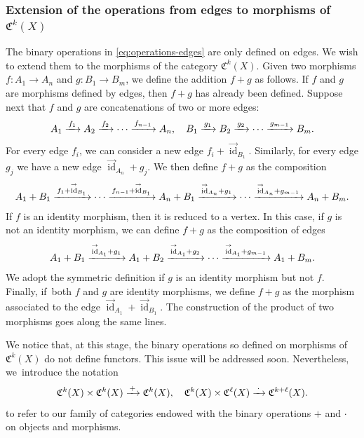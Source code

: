 \documentclass[JEP,XML,SOM,Unicode,published]{cedram}
\newcommand\To[1]{\mathchoice{\xrightarrow{\kern1pt#1\kern1pt}}{\stackrel{#1}{\longrightarrow}}{}{}}
\theoremstyle{plain}
\theoremstyle{definition}
\newcommand{\Cfrak}{\mathfrak C}
\DeclareMathOperator{\id}{id}
\begin{document}
\subsubsection*{Extension of the operations from edges to morphisms of $\Cfrak^{k}(X)$} The binary operations in \eqref{eq:operations-edges} are only defined on edges. We wish to extend them to the morphisms of the category $\Cfrak^{k}(X)$. Given two morphisms $f\colon A_{1}\to A_{n}$ and $g\colon B_{1}\to B_{m}$, we define the addition $f + g$ as follows. If $f$ and $g$ are morphisms defined by edges, then $f+g$ has already been defined. Suppose next that $f$ and $g$ are concatenations of two or more edges:
\begin{displaymath}
A_{1}\To{f_{1}} A_{2}\To{f_{2}}\cdots\To{f_{n-1}} A_{n},\quad B_{1}\To{g_{1}}B_{2}\To{g_{2}}\cdots\To{g_{m-1}} B_{m}.
\end{displaymath}
For every edge $f_{i}$, we can consider a new edge $f_{i}+\overset{\to}{\id}_{B_{1}}$. Similarly, for every edge $g_{j}$ we have a new edge $\overset{\to}{\id}_{A_{n}}+g_{j}$. We then define $f+ g$ as the composition
\begin{displaymath}
\begin{split}
A_{1}+B_{1}\To{f_{1}+\overset{\to}{\id}_{B_{1}}} \cdots\To{f_{n-1}+\overset{\to}{\id}_{B_{1}}} A_{n}+B_{1}\To{\overset{\to}{\id}_{A_{n}}+g_{1}}\cdots\To{\overset{\to}{\id}_{A_{n}}+g_{m-1}} A_{n}+B_{m}.
\end{split}
\end{displaymath}
If $f$ is an identity morphism, then it is reduced to a vertex. In this case, if $g$ is not an identity morphism, we can define $f+ g$ as the composition of edges
\begin{displaymath}
A_{1}+B_{1}\To{\overset{\to}{\id}_{A_{1}}+g_{1}}A_{1}+B_{2}\To{\overset{\to}{\id}_{A_{1}}+g_{2}}\cdots\To{\overset{\to}{\id}_{A_{1}}+g_{m-1}}A_{1}+B_{m}.
\end{displaymath}
We adopt the symmetric definition if $g$ is an identity morphism but not $f$. Finally, if~both $f$ and $g$ are identity morphisms, we define $f+ g$ as the morphism associated to the edge $\overset{\to}{\id}_{A_{1}}+\overset{\to}{\id}_{B_{1}}$. The construction of the product of two morphisms goes along the same lines.

We notice that, at this stage, the binary operations so defined on morphisms of $\Cfrak^{k}(X)$ do not define functors. This issue will be addressed soon. Nevertheless, we~introduce the notation
\begin{equation}\label{eq:binary-operations-on-Ck}
\Cfrak^{k}(X)\times\Cfrak^{k}(X)\To{+}\Cfrak^{k}(X),\quad \Cfrak^{k}(X)\times\Cfrak^{\ell}(X)\To{\,\cdot\,}\Cfrak^{k+\ell}(X).
\end{equation}
to refer to our family of categories endowed with the binary operations $+$ and $\cdot$ on objects and morphisms.
\end{document}
